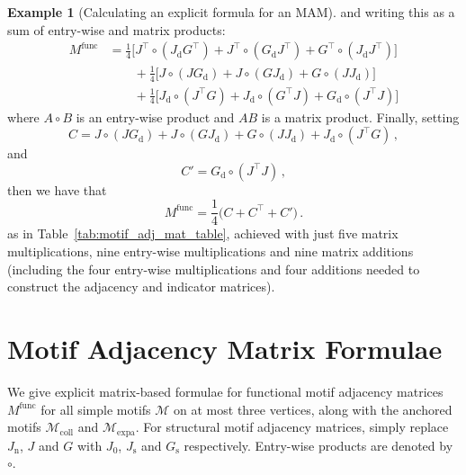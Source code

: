 \documentclass[12pt,draft]{ociamthesis}
\theoremstyle{plain}
\theoremstyle{definition}
\newtheorem{example}{Example}[chapter]
\theoremstyle{remark}
\newcommand\ca[1]{\mathcal{#1}}
\begin{document}
\begin{example}[Calculating an explicit formula for an MAM]
  \endgroup
  and writing this as a sum of entry-wise and matrix products:
  \begin{align*}
    M^\textrm{func} &= \frac{1}{4} \Big[ J^\top \circ (J_\mathrm{d} G^\top) +
      J^\top \circ (G_\mathrm{d} J^\top) + G^\top \circ (J_\mathrm{d} J^\top)
    \Big] \\
    & \qquad + \frac{1}{4} \Big[ J \circ (J G_\mathrm{d}) + J \circ (G
    J_\mathrm{d}) + G \circ (J J_\mathrm{d}) \Big] \\
    & \qquad + \frac{1}{4} \Big[ J_\mathrm{d} \circ (J^\top G) + J_\mathrm{d}
    \circ (G^\top J) + G_\mathrm{d} \circ (J^\top J) \Big]
  \end{align*}
  where $A \circ B$ is an entry-wise product and $AB$ is a matrix product.
  Finally, setting
  $$C = J \circ (J G_\mathrm{d}) + J \circ (G J_\mathrm{d}) + G \circ (J
  J_\mathrm{d}) + J_\mathrm{d} \circ (J^\top G)\,, $$
  and
  $$ C' = G_\mathrm{d} \circ (J^\top J)\,, $$
  then we have that
  $$ M^\mathrm{func} = \frac{1}{4} \big(C + C^\top + C' \big)\,. $$
  as in Table~\ref{tab:motif_adj_mat_table}, achieved with just five matrix
  multiplications, nine entry-wise multiplications and nine matrix additions
  (including the four entry-wise multiplications and four additions needed to
  construct the adjacency and indicator matrices).
\end{example}
\clearpage{}
\clearpage{}
\chapter{Motif Adjacency Matrix Formulae}
\label{chap:appendix_matrices}

We give explicit matrix-based formulae for functional motif adjacency matrices
$M^\mathrm{func}$ for all simple motifs $\ca{M}$ on at most three vertices,
along with the anchored motifs $\ca{M}_\mathrm{coll}$ and
$\ca{M}_\mathrm{expa}$. For structural motif adjacency matrices, simply replace
$J_\mathrm{n}$, $J$ and $G$ with $J_0$, $J_\mathrm{s}$ and $G_\mathrm{s}$
respectively. Entry-wise products are denoted by $\circ$.
\end{document}
